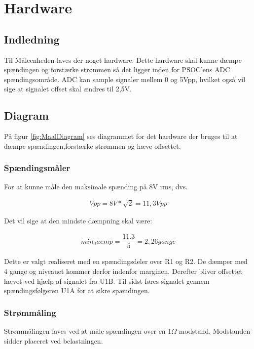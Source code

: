 
\section{Hardware}
\subsection{Indledning}
Til Måleenheden laves der noget hardware. Dette hardware skal kunne dæmpe spændingen og forstærke strømmen så det ligger inden for PSOC'ens ADC spændingsområde. ADC kan sample signaler mellem 0 og 5Vpp, hvilket også vil sige at signalet offset skal ændres til 2,5V.

\subsection{Diagram}

På figur \ref{fig:MaalDiagram} ses diagrammet for det hardware der bruges til at dæmpe spændingen,forstærke strømmen og hæve offsettet.

\subsubsection{Spændingsmåler}
For at kunne måle den maksimale spænding på 8V rms, dvs.

\begin{align}
Vpp = 8V*\sqrt{2} = 11,3Vpp
\end{align}

Det vil sige at den mindste dæmpning skal være:

\begin{align}
min_daemp = \dfrac{11.3}{5} = 2,26 gange
\end{align}

Dette er valgt realiseret med en spændingsdeler over R1 og R2. De dæmper med 4 gange og niveauet kommer derfor indenfor marginen.
Derefter bliver offsettet hævet ved hjælp af signalet fra U1B. Til sidst føres signalet gennem spændingsfølgeren U1A for at sikre spændingen.

\subsubsection{Strømmåling}
Strømmålingen laves ved at måle spændingen over en 1$\Omega$ modstand. Modstanden sidder placeret ved belastningen.
 

